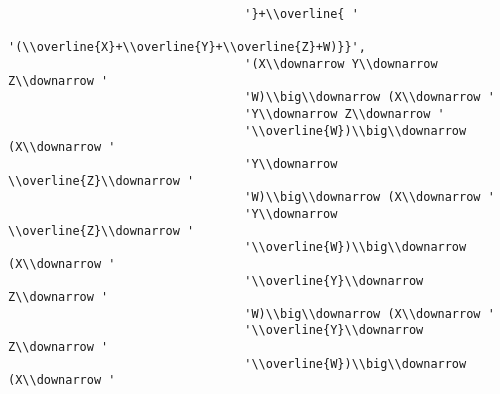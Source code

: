 \begin{verbatim}
                                 '}+\\overline{ '
                                 '(\\overline{X}+\\overline{Y}+\\overline{Z}+W)}}',
                                 '(X\\downarrow Y\\downarrow Z\\downarrow '
                                 'W)\\big\\downarrow (X\\downarrow '
                                 'Y\\downarrow Z\\downarrow '
                                 '\\overline{W})\\big\\downarrow (X\\downarrow '
                                 'Y\\downarrow \\overline{Z}\\downarrow '
                                 'W)\\big\\downarrow (X\\downarrow '
                                 'Y\\downarrow \\overline{Z}\\downarrow '
                                 '\\overline{W})\\big\\downarrow (X\\downarrow '
                                 '\\overline{Y}\\downarrow Z\\downarrow '
                                 'W)\\big\\downarrow (X\\downarrow '
                                 '\\overline{Y}\\downarrow Z\\downarrow '
                                 '\\overline{W})\\big\\downarrow (X\\downarrow '

\end{verbatim}
